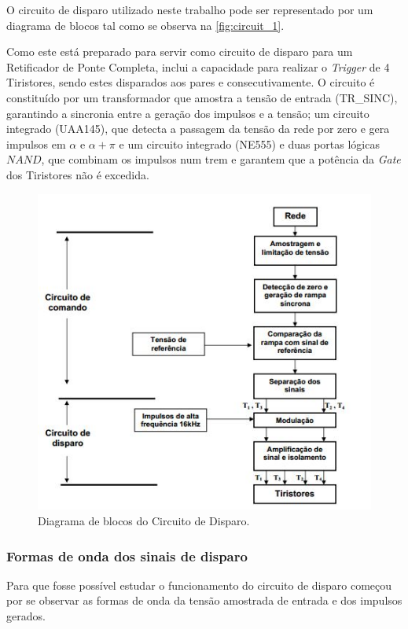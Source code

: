 \documentclass[a4paper,11pt]{article}
\numberwithin{equation}{section}
\begin{document}
O circuito de disparo utilizado neste trabalho pode ser representado por um diagrama de blocos tal como se observa na \autoref{fig:circuit_1}.

Como este está preparado para servir como circuito de disparo para um Retificador de Ponte Completa, inclui a capacidade para realizar o \textit{Trigger} de 4 Tiristores, sendo estes disparados aos pares e consecutivamente. O circuito é constituído por um transformador que amostra a tensão de entrada (TR\_SINC), garantindo a sincronia entre a geração dos impulsos e a tensão; um circuito integrado (UAA145), que detecta a passagem da tensão da rede por zero e gera impulsos em $\alpha$ e $\alpha + \pi$ e um circuito integrado (NE555) e duas portas lógicas $NAND$, que combinam os impulsos num trem e garantem que a potência da \textit{Gate} dos Tiristores não é excedida.

\begin{figure}[h]
	\centering
	\includegraphics[keepaspectratio=true, scale=0.8]{teoricas/circuito_disparo.jpg}
	\caption{Diagrama de blocos do Circuito de Disparo.}
	\label{fig:circuit_1}
	\vspace{-0.8em}
\end{figure}

\subsubsection{Formas de onda dos sinais de disparo}

Para que fosse possível estudar o funcionamento do circuito de disparo começou por se observar as formas de onda da tensão amostrada de entrada e dos impulsos gerados.
\end{document}
